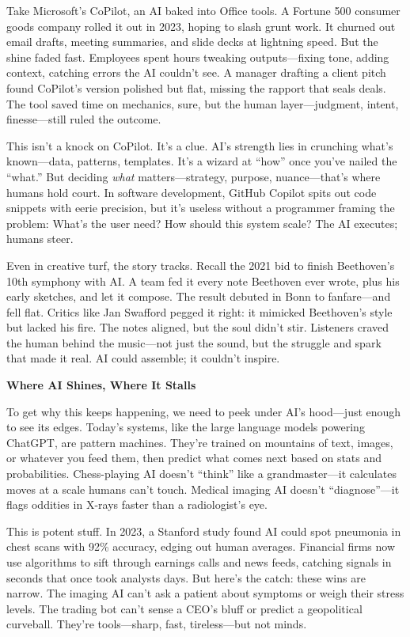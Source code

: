 \documentclass[
  Letterpaper,
]{scrbook}
\begin{document}
Take Microsoft's CoPilot, an AI baked into Office tools. A Fortune 500
consumer goods company rolled it out in 2023, hoping to slash grunt
work. It churned out email drafts, meeting summaries, and slide decks at
lightning speed. But the shine faded fast. Employees spent hours
tweaking outputs---fixing tone, adding context, catching errors the AI
couldn't see. A manager drafting a client pitch found CoPilot's version
polished but flat, missing the rapport that seals deals. The tool saved
time on mechanics, sure, but the human layer---judgment, intent,
finesse---still ruled the outcome.

This isn't a knock on CoPilot. It's a clue. AI's strength lies in
crunching what's known---data, patterns, templates. It's a wizard at
``how'' once you've nailed the ``what.'' But deciding \emph{what}
matters---strategy, purpose, nuance---that's where humans hold court. In
software development, GitHub Copilot spits out code snippets with eerie
precision, but it's useless without a programmer framing the problem:
What's the user need? How should this system scale? The AI executes;
humans steer.

Even in creative turf, the story tracks. Recall the 2021 bid to finish
Beethoven's 10th symphony with AI. A team fed it every note Beethoven
ever wrote, plus his early sketches, and let it compose. The result
debuted in Bonn to fanfare---and fell flat. Critics like Jan Swafford
pegged it right: it mimicked Beethoven's style but lacked his fire. The
notes aligned, but the soul didn't stir. Listeners craved the human
behind the music---not just the sound, but the struggle and spark that
made it real. AI could assemble; it couldn't inspire.

\textbf{Where AI Shines, Where It Stalls}

To get why this keeps happening, we need to peek under AI's hood---just
enough to see its edges. Today's systems, like the large language models
powering ChatGPT, are pattern machines. They're trained on mountains of
text, images, or whatever you feed them, then predict what comes next
based on stats and probabilities. Chess-playing AI doesn't ``think''
like a grandmaster---it calculates moves at a scale humans can't touch.
Medical imaging AI doesn't ``diagnose''---it flags oddities in X-rays
faster than a radiologist's eye.

This is potent stuff. In 2023, a Stanford study found AI could spot
pneumonia in chest scans with 92\% accuracy, edging out human averages.
Financial firms now use algorithms to sift through earnings calls and
news feeds, catching signals in seconds that once took analysts days.
But here's the catch: these wins are narrow. The imaging AI can't ask a
patient about symptoms or weigh their stress levels. The trading bot
can't sense a CEO's bluff or predict a geopolitical curveball. They're
tools---sharp, fast, tireless---but not minds.
\end{document}
